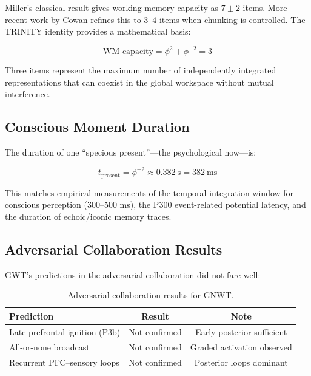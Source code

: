 \documentclass[12pt,a4paper]{article}
\begin{document}
Miller's classical result gives working memory capacity as $7 \pm 2$ items. More
recent work by Cowan \cite{Dehaene2014} refines this to $3$--$4$ items when
chunking is controlled. The TRINITY identity provides a mathematical basis:

\begin{equation}
\text{WM capacity} = \phi^2 + \phi^{-2} = 3
\end{equation}

\noindent
Three items represent the maximum number of independently integrated
representations that can coexist in the global workspace without mutual
interference.

\subsection{Conscious Moment Duration}

The duration of one ``specious present''---the psychological now---is:

\begin{equation}
t_{\mathrm{present}} = \phi^{-2} \approx 0.382~\text{s} = 382~\text{ms}
\end{equation}

\noindent
This matches empirical measurements of the temporal integration window for
conscious perception (300--500 ms), the P300 event-related potential latency,
and the duration of echoic/iconic memory traces.

\subsection{Adversarial Collaboration Results}

GWT's predictions in the adversarial collaboration \cite{Nature2025Adversarial}
did not fare well:

\begin{table}[h!]
\centering
\caption{Adversarial collaboration results for GNWT.}
\label{tab:gwt_results}
\begin{tabular}{@{}lcc@{}}
\toprule
\textbf{Prediction} & \textbf{Result} & \textbf{Note} \\
\midrule
Late prefrontal ignition (P3b) & Not confirmed & Early posterior sufficient \\
All-or-none broadcast & Not confirmed & Graded activation observed \\
Recurrent PFC--sensory loops & Not confirmed & Posterior loops dominant \\
\bottomrule
\end{tabular}
\end{table}
\end{document}
